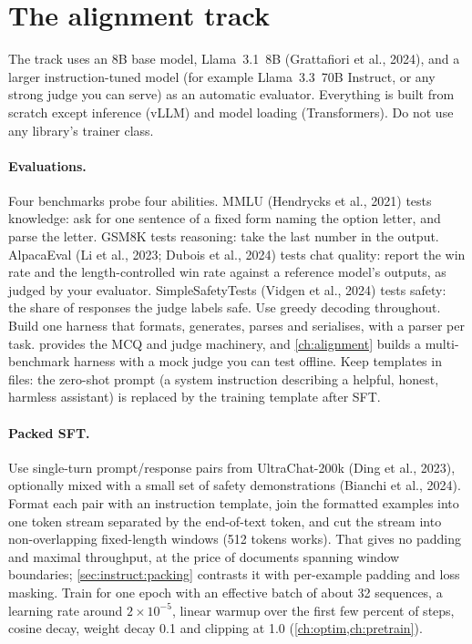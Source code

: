 \section{The alignment track}\label{sec:proj5:supplement}

The track uses an 8B base model, Llama~3.1~8B (Grattafiori et al., 2024), and a larger
instruction-tuned model (for example Llama~3.3~70B Instruct, or any strong judge you can serve) as
an automatic evaluator. Everything is built from scratch except inference (vLLM) and model loading
(Transformers). Do not use any library's trainer class.

\paragraph{Evaluations.} Four benchmarks probe four abilities. MMLU (Hendrycks et al., 2021) tests
knowledge: ask for one sentence of a fixed form naming the option letter, and parse the letter.
GSM8K tests reasoning: take the last number in the output. AlpacaEval (Li et al., 2023; Dubois et al.,
2024) tests chat quality: report the win rate and the length-controlled win rate against a reference
model's outputs, as judged by your evaluator. SimpleSafetyTests (Vidgen et al., 2024) tests safety: the
share of responses the judge labels safe. Use greedy decoding throughout. Build one harness that
formats, generates, parses and serialises, with a parser per task.  provides the MCQ and
judge machinery, and \cref{ch:alignment} builds a multi-benchmark harness with a mock judge you can test
offline. Keep templates in files: the zero-shot prompt (a system instruction describing a helpful,
honest, harmless assistant) is replaced by the training template after SFT.

\paragraph{Packed SFT.} Use single-turn prompt/response pairs from UltraChat-200k (Ding et al., 2023),
optionally mixed with a small set of safety demonstrations (Bianchi et al., 2024). Format each pair
with an instruction template, join the formatted examples into one token stream separated by the
end-of-text token, and cut the stream into non-overlapping fixed-length windows (512 tokens works).
That gives no padding and maximal throughput, at the price of documents spanning window boundaries;
\cref{sec:instruct:packing} contrasts it with per-example padding and loss masking. Train for one epoch
with an effective batch of about 32 sequences, a learning rate around $2\times10^{-5}$, linear warmup over
the first few percent of steps, cosine decay, weight decay 0.1 and clipping at 1.0
(\cref{ch:optim,ch:pretrain}).

